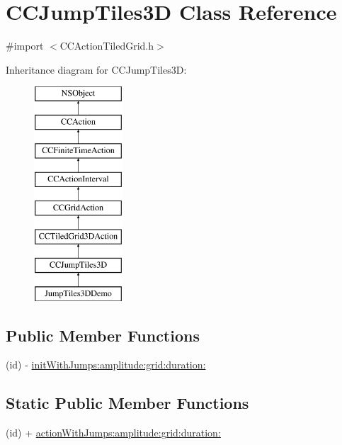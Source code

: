 \hypertarget{interface_c_c_jump_tiles3_d}{\section{C\-C\-Jump\-Tiles3\-D Class Reference}
\label{interface_c_c_jump_tiles3_d}
}


{\ttfamily \#import $<$C\-C\-Action\-Tiled\-Grid.\-h$>$}

Inheritance diagram for C\-C\-Jump\-Tiles3\-D\-:\begin{figure}[H]
\begin{center}
\leavevmode
\includegraphics[height=8.000000cm]{interface_c_c_jump_tiles3_d}
\end{center}
\end{figure}
\subsection*{Public Member Functions}
\begin{DoxyCompactItemize}
\item 
(id) -\/ \hyperlink{interface_c_c_jump_tiles3_d_a046d43c6588416057d9b14f8a7c92520}{init\-With\-Jumps\-:amplitude\-:grid\-:duration\-:}
\end{DoxyCompactItemize}
\subsection*{Static Public Member Functions}
\begin{DoxyCompactItemize}
\item 
(id) + \hyperlink{interface_c_c_jump_tiles3_d_a562d9b96f80c87e6f7b283734077d9b6}{action\-With\-Jumps\-:amplitude\-:grid\-:duration\-:}
\end{DoxyCompactItemize}
